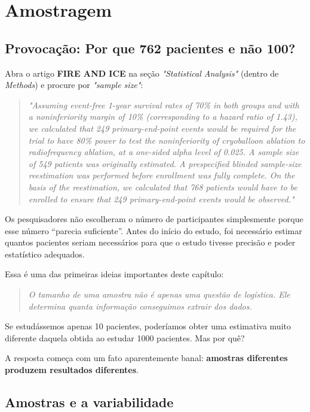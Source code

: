 \chapter{Amostragem}

\section{Provocação: Por que 762 pacientes e não 100?}

Abra o artigo \textbf{FIRE AND ICE} na seção \textit{"Statistical Analysis"} (dentro de \textit{Methods}) e procure por \textit{"sample size"}:

\begin{quote}
\small\itshape
"Assuming event-free 1-year survival rates of 70\% in both groups and with a noninferiority margin of 10\% (corresponding to a hazard ratio of 1.43), we calculated that 249 primary-end-point events would be required for the trial to have 80\% power to test the noninferiority of cryoballoon ablation to radiofrequency ablation, at a one-sided alpha level of 0.025. A sample size of 549 patients was originally estimated. A prespecified blinded sample-size reestimation was performed before enrollment was fully complete. On the basis of the reestimation, we calculated that 768 patients would have to be enrolled to ensure that 249 primary-end-point events would be observed."
\end{quote}

Os pesquisadores não escolheram o número de participantes simplesmente porque esse número ``parecia suficiente''. Antes do início do estudo, foi necessário estimar quantos pacientes seriam necessários para que o estudo tivesse precisão e poder estatístico adequados.

Essa é uma das primeiras ideias importantes deste capítulo:

\begin{quote}
\textit{O tamanho de uma amostra não é apenas uma questão de logística. Ele determina quanta informação conseguimos extrair dos dados.}
\end{quote}

Se estudássemos apenas 10 pacientes, poderíamos obter uma estimativa muito diferente daquela obtida ao estudar 1000 pacientes. Mas por quê?

A resposta começa com um fato aparentemente banal: \textbf{amostras diferentes produzem resultados diferentes}.

\section{Amostras e a variabilidade}

